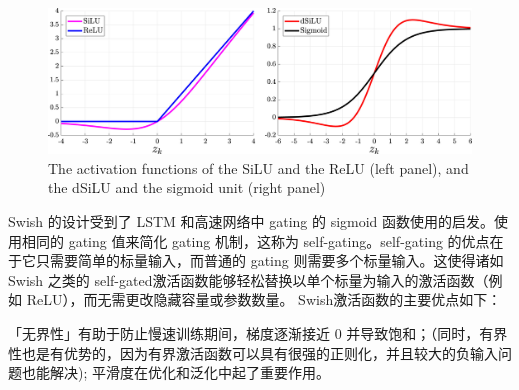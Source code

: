 \documentclass{article}
\begin{document}
\begin{figure}[htp]
\centering
\includegraphics[scale=1]{images/activation/SiLU.jpg}
\caption{The activation functions of the SiLU and the ReLU (left panel), and the dSiLU and the sigmoid unit (right panel)}
\label{SiLU}
\end{figure}

Swish 的设计受到了 LSTM 和高速网络中 gating 的 sigmoid 函数使用的启发。使用相同的 gating 值来简化 gating 机制，这称为 self-gating。self-gating 的优点在于它只需要简单的标量输入，而普通的 gating 则需要多个标量输入。这使得诸如 Swish 之类的 self-gated激活函数能够轻松替换以单个标量为输入的激活函数（例如 ReLU），而无需更改隐藏容量或参数数量。
Swish激活函数的主要优点如下：

「无界性」有助于防止慢速训练期间，梯度逐渐接近 0 并导致饱和；（同时，有界性也是有优势的，因为有界激活函数可以具有很强的正则化，并且较大的负输入问题也能解决);
平滑度在优化和泛化中起了重要作用。
\end{document}
